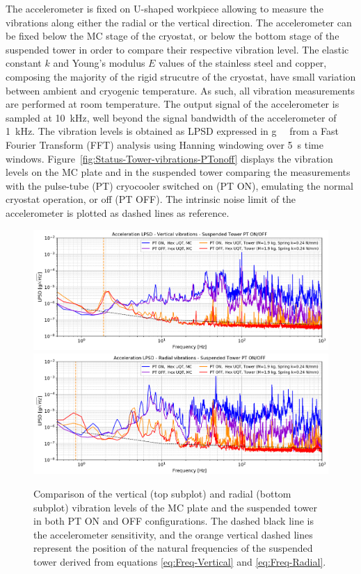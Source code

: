 The accelerometer is fixed on U-shaped workpiece allowing to measure the vibrations along either the radial or the vertical direction.  The accelerometer can be fixed below the MC stage of the cryostat, or below the bottom stage of the suspended tower in order to compare their respective vibration level. 
The elastic constant $k$ and Young's modulus $E$ values of the stainless steel and copper, composing the majority of the rigid strucutre of the cryostat, have small variation between ambient and cryogenic temperature. As such, all vibration measurements are performed at room temperature.
The output signal of the accelerometer is sampled at \SI{10}{\kilo\Hz}, well beyond the signal bandwidth of the accelerometer of \SI{1}{\kilo\Hz}. The vibration levels is obtained as LPSD expressed in \si{g \per \sqrthz} from a Fast Fourier Transform (FFT) analysis using Hanning windowing over \SI{5}{\s} time windows.
Figure~\ref{fig:Status-Tower-vibrations-PTonoff} displays the vibration levels on the MC plate and in the suspended tower comparing the measurements with the pulse-tube (PT) cryocooler switched on (PT ON), emulating the normal cryostat operation, or off (PT OFF). The intrinsic noise limit of the accelerometer is plotted as dashed lines as reference.

\begin{figure}
\centering 
\includegraphics[width=\textwidth]{Figures/Experiment/vibration_vertical.pdf}
\includegraphics[width=\textwidth]{Figures/Experiment/vibration_radial.pdf}
\caption{Comparison of the vertical (top subplot) and radial (bottom subplot) vibration levels of the MC plate and the suspended tower in both PT ON and OFF configurations. The dashed black line is the accelerometer sensitivity, and the orange vertical dashed lines represent the position of the natural frequencies of the suspended tower derived from equations \ref{eq:Freq-Vertical} and \ref{eq:Freq-Radial}.}
\label{fig:vibration-levels}
\end{figure}

